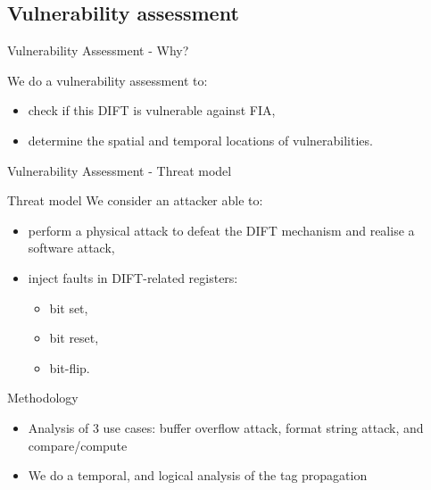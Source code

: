 \subsection{Vulnerability assessment}
\begin{frame}{Vulnerability Assessment - Why?}
    \begin{block}{}
        We do a vulnerability assessment to:
        \begin{itemize}
            [triangle]
            \justifying
            \item check if this DIFT is vulnerable against FIA,
            \item determine the spatial and temporal locations of vulnerabilities.
        \end{itemize}
    \end{block}
\end{frame}

\begin{frame}{Vulnerability Assessment - Threat model}
    \begin{block}{Threat model}
        We consider an attacker able to:
        \begin{itemize}
            \item perform a physical attack to defeat the DIFT mechanism and realise a software attack,
            \item inject faults in DIFT-related registers:
                  \begin{itemize}
                      \item bit set,
                      \item bit reset,
                      \item bit-flip.
                  \end{itemize}
        \end{itemize}
    \end{block}

    \begin{block}{Methodology}
        \begin{itemize}
            \item Analysis of 3 use cases: buffer overflow attack, format string attack, and compare/compute
            \item We do a temporal, and logical analysis of the tag propagation
        \end{itemize}
    \end{block}
\end{frame}
